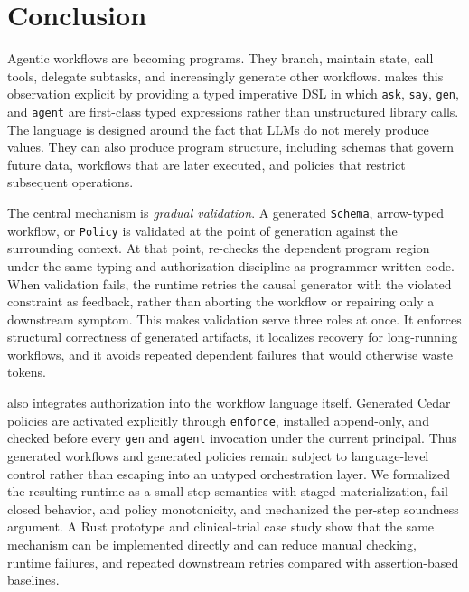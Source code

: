 \section{Conclusion}
\label{sec:conclusion}

Agentic workflows are becoming programs. They branch, maintain 
state, call tools, delegate subtasks, and increasingly generate 
other workflows. \pact{} makes this observation explicit by 
providing a typed imperative DSL in which \texttt{ask}, 
\texttt{say}, \texttt{gen}, and \texttt{agent} are first-class 
typed expressions rather than unstructured library calls. The 
language is designed around the fact that LLMs do not merely 
produce values. They can also produce program structure, including 
schemas that govern future data, workflows that are later executed, 
and policies that restrict subsequent operations.

The central mechanism is \emph{gradual validation}. A generated 
\texttt{Schema}, arrow-typed workflow, or \texttt{Policy} is 
validated at the point of generation against the surrounding context. 
At that point, \pact{} re-checks the dependent program region under the same 
typing and authorization discipline as programmer-written code. 
When validation fails, the runtime retries the causal generator 
with the violated constraint as feedback, rather than aborting the 
workflow or repairing only a downstream symptom. This makes 
validation serve three roles at once. It enforces structural 
correctness of generated artifacts, it localizes recovery for 
long-running workflows, and it avoids repeated dependent failures 
that would otherwise waste tokens.

\pact{} also integrates authorization into the workflow language 
itself. Generated Cedar policies are activated explicitly through 
\texttt{enforce}, installed append-only, and checked before every 
\texttt{gen} and \texttt{agent} invocation under the current 
principal. Thus generated workflows and generated policies remain 
subject to language-level control rather than escaping into an 
untyped orchestration layer. We formalized the resulting runtime 
as a small-step semantics with staged materialization, fail-closed 
behavior, and policy monotonicity, and mechanized the per-step 
soundness argument. A Rust prototype and clinical-trial 
case study show that the same mechanism can be implemented 
directly and can reduce manual checking, runtime failures, and 
repeated downstream retries compared with assertion-based 
baselines.